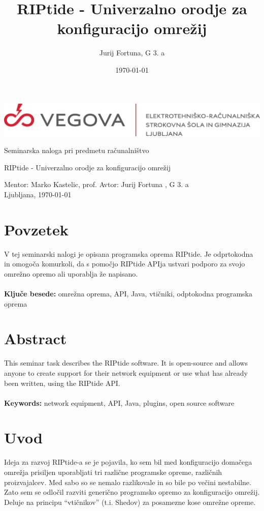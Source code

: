 \documentclass[12pt]{article}
\title{RIPtide - Univerzalno orodje za konfiguracijo omrežij}
\author{Jurij Fortuna, G 3. a}
\date{\MMYYYYdate\today}
\begin{document}
\begin{center}
	\thispagestyle{empty}
	\includegraphics[scale=1]{slike/vegova.png}

	\vspace{\fill}
	Seminarska naloga pri predmetu računalništvo

	\Huge{RIPtide - Univerzalno orodje za konfiguracijo omrežij}

	\normalsize
	\vspace{\fill}

	Mentor: Marko Kastelic, prof. \hfill Avtor: Jurij Fortuna , G 3. a\\
	\null
	Ljubljana, \MMYYYYdate\today
\end{center}
\newpage

\section*{Povzetek}
V tej seminarski nalogi je opisana programska oprema RIPtide. Je
odprtokodna in omogoča komurkoli, da s pomočjo RIPtide APIja ustvari
podporo za svojo omrežno opremo ali uporablja že napisano.\\\\
\textbf{Ključe besede:} omrežna oprema, API, Java, vtičniki, odptokodna
programska oprema\\

\section*{Abstract}
\foreignlanguage{english}{
	This seminar task describes the RIPtide software. It is open-source
	and allows anyone to create support for their network equipment or
	use what has already been written, using the RIPtide API.\\\\
	\textbf{Keywords:} network equipment, API, Java, plugins, open source
	software
}
\newpage

\tableofcontents
\newpage

\section{Uvod}
Ideja za razvoj RIPtide-a se je pojavila, ko sem bil med konfiguracijo
domačega omrežja prisiljen uporabljati tri različne programske opreme,
različnih proizvajalcev. Med sabo so se nemalo razlikovale in so bile
po večini nestabilne. Zato sem se odločil razviti generično programsko
opremo za konfiguracijo omrežij. Deluje na principu
“vtičnikov” (t.i. Shedov) za posamezne kose omrežne opreme.\\\\\\
\end{document}

